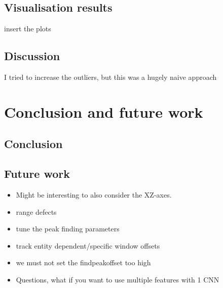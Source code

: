 \section{Visualisation results}
insert the plots

\section{Discussion}
I tried to increase the outliers, but this was a hugely naive approach

\chapter{Conclusion and future work}

\section{Conclusion}

\section{Future work}

\begin{itemize}
	\item Might be interesting to also consider the XZ-axes.
	\item range defects
	\item tune the peak finding parameters
	\item track entity dependent/specific window offsets
	\item we must not set the findpeakoffset too high
	\item Questions, what if you want to use multiple features with 1 CNN
	
	
\end{itemize}

\newpage
